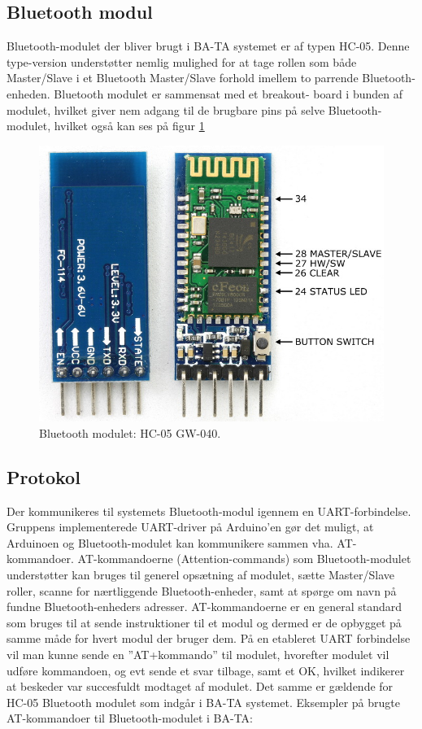 \graphicspath{{Chapters/BluetoothModul/}}


\subsection{Bluetooth modul}

Bluetooth-modulet der bliver brugt i BA-TA systemet er af typen HC-05. Denne type-version understøtter nemlig mulighed for at tage rollen som både Master/Slave i et Bluetooth Master/Slave forhold imellem to parrende Bluetooth-enheden. Bluetooth modulet er sammensat med et breakout- board i bunden af modulet, hvilket giver nem adgang til de brugbare pins på selve Bluetooth-modulet, hvilket også kan ses på figur \ref{fig:bluetooth_modul}

\begin{figure}[H]
	\centering
	\includegraphics[width = 200 pt]{Img/modul.PNG}
	\caption{Bluetooth modulet: HC-05 GW-040.}
	\label{fig:bluetooth_modul}
\end{figure}

\subsection{Protokol}
Der kommunikeres til systemets Bluetooth-modul igennem en UART-forbindelse. Gruppens implementerede UART-driver på Arduino’en gør det muligt, at Arduinoen og Bluetooth-modulet kan kommunikere sammen vha. AT-kommandoer. 
AT-kommandoerne (Attention-commands) som Bluetooth-modulet understøtter kan bruges til generel opsætning af modulet, sætte Master/Slave roller, scanne for nærtliggende Bluetooth-enheder, samt at spørge om navn på fundne Bluetooth-enheders adresser. AT-kommandoerne er en general standard som bruges til at sende instruktioner til et modul og dermed er de opbygget på samme måde for hvert modul der bruger dem. På en etableret UART forbindelse vil man kunne sende en ”AT+kommando” til modulet, hvorefter modulet vil udføre kommandoen, og evt sende et svar tilbage, samt et OK, hvilket indikerer at beskeder var succesfuldt modtaget af modulet. Det samme er gældende for HC-05 Bluetooth modulet som indgår i BA-TA systemet.
Eksempler på brugte AT-kommandoer til Bluetooth-modulet i BA-TA:

